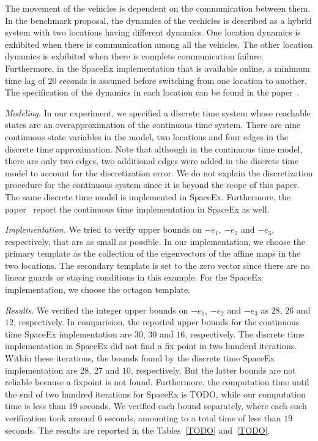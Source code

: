 The movement of the vehicles is dependent on the communication between
them.  In the benchmark proposal, the dynamics of the vechicles is
described as a hybrid system with two locations having different
dynamics.  One location dynamics is exhibited when there is
communication among all the vehicles.  The other location dynamics is
exhibited when there is complete communication failure.  Furthermore,
in the SpaceEx implementation that is available online, a minimum time
lag of 20 seconds is assumed before switching from one location to
another.  The specification of the dynamics in each location can be
found in the paper~\cite{}.

\emph{Modeling.}  In our experiment, we specified a discrete time
system whose reachable states are an overapproximation of the
continuous time system.  There are nine continuous state variables in
the model, two locations and four edges in the discrete time
approximation.  Note that although in the continuous time model, there
are only two edges, two additional edges were added in the discrete
time model to account for the discretization error.  We do not explain
the discretization procedure for the continuous system since it is
beyond the scope of this paper.  The same discrete time model is
implemented in SpaceEx.  Furthermore, the paper~\cite{TODO} report the
continuous time implementation in SpaceEx as well.

\emph{Implementation.}  We tried to verify upper
bounds on $-e_1$, $-e_2$ and $-e_3$, respectively, that are as small
as possible.  In our implementation, we choose the primary
template as the collection of the eigenvectors of the affine maps in
the two locations.  The secondary template is set to the zero vector
since there are no linear guards or staying conditions in this
example.  For the SpaceEx implementation, we choose the octagon
template.

\emph{Results.}  We verified the integer upper bounds on $-e_1$,
$-e_2$ and $-e_3$ as $28$, $26$ and $12$, respectively.  In
comparision, the reported upper bounds for the continuous time SpaceEx
implementation are $30$, $30$ and $16$, respectively.  The discrete
time implementation in SpaceEx did not find a fix point in two hunderd
iterations.  Within these iterations, the bounds found by the discrete
time SpaceEx implementation are $28$, $27$ and $10$, respectively.
But the latter bounds are not reliable because a fixpoint is not
found.  Furthermore, the computation time until the end of two hundred
iterations for SpaceEx is TODO, while our computation time is less
than $19$ seconds.  We verified each bound separately, where each such
verification took around $6$ seconds, amounting to a total time of
less than $19$ seconds.  The results are reported in the
Tables~\ref{TODO} and~\ref{TODO}.


